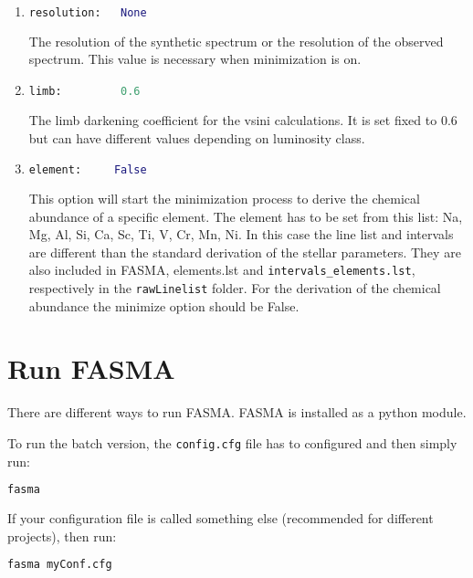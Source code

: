 \documentclass[a4paper,12pt]{article}
\begin{document}
\begin{enumerate}
\item
\begin{lstlisting}[language=Python]
resolution:   None
\end{lstlisting}
The resolution of the synthetic spectrum or the resolution of the observed spectrum. This value is necessary when minimization is on.

\item
\begin{lstlisting}[language=Python]
limb:         0.6
\end{lstlisting}
The limb darkening coefficient for the vsini calculations. It is set fixed to 0.6 but can have different values depending on luminosity class.

\item
\begin{lstlisting}[language=Python]
element:     False
\end{lstlisting}
This option will start the minimization process to derive the chemical abundance of a specific element. The element has to be set from this list: 
Na, Mg, Al, Si, Ca, Sc, Ti, V, Cr, Mn, Ni. In this case the line list and intervals are different than the standard derivation of the stellar parameters. 
They are also included in FASMA, elements.lst and \texttt{intervals\_elements.lst}, respectively in the \texttt{rawLinelist} folder. For the derivation of the chemical 
abundance the minimize option should be False. 

\end{enumerate}


\section{Run FASMA}

There are different ways to run FASMA. FASMA is installed as a python module. 

To run the batch version, the \texttt{config.cfg} file has to configured and then simply run:
\begin{lstlisting}[language=Python]
fasma
\end{lstlisting}

If your configuration file is called something else (recommended for different projects), then run:
\begin{lstlisting}[language=Python]
fasma myConf.cfg
\end{lstlisting}
\end{document}

